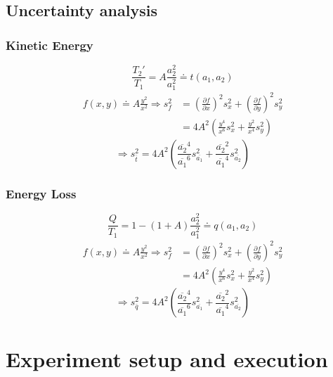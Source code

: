 \documentclass{scrreprt}
\begin{document}
\subsection{Uncertainty analysis}
\subsubsection{Kinetic Energy}
\begin{equation}
\frac{T_2'}{T_1}=A\frac{a_2^2}{a_1^2}\doteq t(a_1,a_2)
\end{equation}
\begin{align}
f(x,y) \doteq A\frac{y^2}{x^2} \Longrightarrow
s_f^2 &= \left(\frac{\partial f}{\partial x}\right)^2 s_x^2 + \left(\frac{\partial f}{\partial y}\right)^2 s_y^2\\
&= 4 A^2 \left( \frac{y^4}{x^6} s_x^2 + \frac{y^2}{x^4} s_y^2 \right)
\end{align}
\begin{equation}
\Longrightarrow s_{\bar{t}}^2 = 4 A^2 \left(\frac{\overline{a_2}^4}{\overline{a_1}^6} s_{\overline{a_1}}^2 + \frac{\overline{a_2}^2}{\overline{a_1}^4} s_{\overline{a_2}}^2 \right)
\end{equation}

\subsubsection{Energy Loss}
\begin{equation}
\frac{Q}{T_1}= 1-(1+A) \frac{a_2^2}{a_1^2} \doteq q(a_1,a_2)
\end{equation}
\begin{align}
f(x,y) \doteq A\frac{y^2}{x^2} \Longrightarrow
s_f^2 &= \left(\frac{\partial f}{\partial x}\right)^2 s_x^2 + \left(\frac{\partial f}{\partial y}\right)^2 s_y^2\\
&= 4 A^2 \left( \frac{y^4}{x^6} s_x^2 + \frac{y^2}{x^4} s_y^2 \right)
\end{align}
\begin{equation}
\Longrightarrow s_{\bar{q}}^2 = 4 A^2 \left(\frac{\overline{a_2}^4}{\overline{a_1}^6} s_{\overline{a_1}}^2 + \frac{\overline{a_2}^2}{\overline{a_1}^4} s_{\overline{a_2}}^2 \right)
\end{equation}

\section{Experiment setup and execution}
\end{document}
